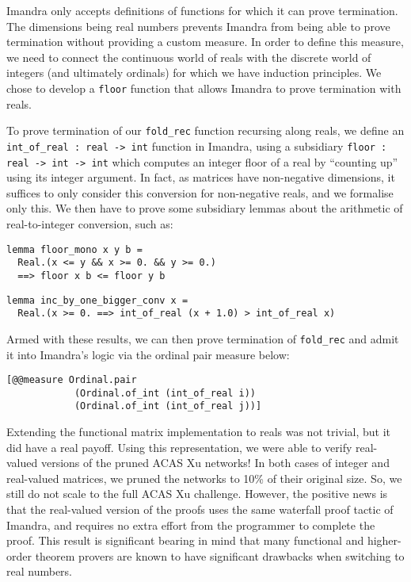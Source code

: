 \documentclass[runningheads]{llncs}
\newcommand{\rnote}[1]{\todo[inline, color=green!20]{#1}}
\begin{document}
\noindent Imandra only accepts definitions of functions for which it can prove termination. The dimensions being real numbers prevents Imandra from being able to prove termination without providing a custom measure. In order to define this measure, we need to connect the continuous world of reals with the discrete world of integers (and ultimately ordinals) for which we have induction principles. We chose to develop a \lstinline{floor} function that allows Imandra to prove termination with reals.


To prove termination of our \lstinline{fold_rec} function recursing along reals, we define an \lstinline{int_of_real : real -> int} function in Imandra, using a subsidiary \lstinline{floor : real -> int -> int} which computes an integer floor of a real by ``counting up'' using its integer argument. In fact, as matrices have non-negative dimensions, it suffices to only consider this conversion for non-negative reals, and we formalise only this. We then have to prove some subsidiary lemmas about the arithmetic of real-to-integer conversion, such as:
%
\begin{lstlisting}[language=caml]
lemma floor_mono x y b =
  Real.(x <= y && x >= 0. && y >= 0.)
  ==> floor x b <= floor y b
\end{lstlisting}

\begin{lstlisting}[language=caml]
lemma inc_by_one_bigger_conv x =
  Real.(x >= 0. ==> int_of_real (x + 1.0) > int_of_real x)
\end{lstlisting}

\noindent Armed with these results, we can then prove termination of \lstinline{fold_rec} and admit it into Imandra's logic via the ordinal pair measure below:
%
\begin{lstlisting}[language=caml]
[@@measure Ordinal.pair
            (Ordinal.of_int (int_of_real i))
            (Ordinal.of_int (int_of_real j))]
\end{lstlisting}

Extending the functional matrix implementation to reals was not trivial, but it did have a real payoff.
Using this representation, we were able to verify real-valued versions of the pruned ACAS Xu networks!
In both cases of integer and real-valued matrices, we pruned the networks to 10\% of their original size.
So, we still do not scale to the full ACAS Xu challenge.  However, the positive news is that the real-valued version
of the proofs
uses the same waterfall proof tactic of Imandra, and requires no extra effort from the programmer to complete the proof.
This result is significant bearing in mind that many functional and higher-order theorem provers are known to have significant drawbacks when switching to real numbers.
\end{document}
